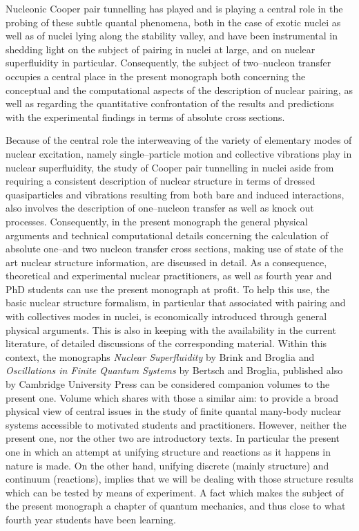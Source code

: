 Nucleonic Cooper pair tunnelling has played and is playing a central role in the probing of these subtle quantal phenomena, both in the case of  exotic nuclei as well as of nuclei lying along the stability valley, and have been instrumental in shedding light on the subject of pairing in nuclei at large, and on nuclear superfluidity in particular. Consequently, the subject of two--nucleon transfer occupies  a central place in the present monograph both concerning the conceptual and the computational aspects of the description of nuclear pairing, as well as regarding the quantitative confrontation of the results and predictions with the experimental findings in terms of absolute cross sections.

Because of the central role the interweaving of the variety of elementary modes of nuclear excitation, namely single--particle motion and collective vibrations play in nuclear superfluidity, the study of Cooper pair tunnelling in nuclei aside from requiring a consistent description of nuclear structure in terms of dressed quasiparticles and vibrations resulting from both bare and induced interactions, also involves  the description of one--nucleon transfer as well as knock out processes. Consequently, in the present monograph the general physical arguments and technical computational details concerning the   calculation of  absolute one--and two nucleon  transfer cross sections, making use of state of the art nuclear structure information, are discussed in detail. As a consequence, theoretical and experimental nuclear practitioners, as well as fourth year and PhD students can use the present monograph at profit. To help this use, the basic nuclear structure formalism, in particular that associated with pairing and with collectives modes in nuclei, is economically introduced through general physical arguments. This is also in keeping with the availability in the current literature, of detailed discussions of the corresponding material. Within this context, the monographs \emph{Nuclear Superfluidity} by Brink and Broglia and \emph{Oscillations in Finite Quantum Systems}  by Bertsch and Broglia, published also by Cambridge University Press can be considered companion volumes to the present one. Volume which shares with those a similar aim: to provide a broad physical view of central issues in the study of finite quantal many-body nuclear systems accessible to motivated students and practitioners. However, neither the present one, nor the other two are introductory texts. In particular the present one in which an attempt at unifying structure and reactions as it happens in nature is made. On the other hand, unifying discrete (mainly structure) and continuum (reactions), implies that we will be dealing with those structure results which can be tested by means of experiment. A fact which makes the subject of the present monograph a chapter of quantum mechanics, and thus close to what fourth year students have been learning.

